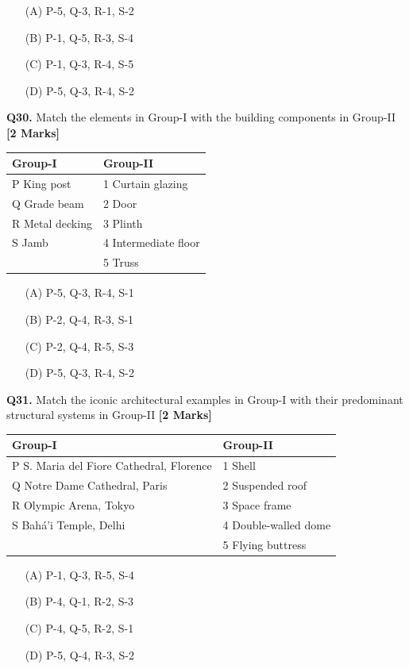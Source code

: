 \documentclass[11pt]{article}
\newcommand{\questionb}[2]{
    \noindent\textbf{Q#2.} #1 \hfill \textbf{[2 Marks]}
}
\begin{document}
\begin{enumerate}
    \item[(A)] P-5, Q-3, R-1, S-2
    \item[(B)] P-1, Q-5, R-3, S-4
    \item[(C)] P-1, Q-3, R-4, S-5
    \item[(D)] P-5, Q-3, R-4, S-2
\end{enumerate}
\vspace{0.5cm}

\questionb{Match the elements in Group-I with the building components in Group-II}{30}
\begin{tabularx}{\textwidth}{|l|X|}
\hline
\textbf{Group-I} & \textbf{Group-II} \\
\hline
P King post & 1 Curtain glazing \\
Q Grade beam & 2 Door \\
R Metal decking & 3 Plinth \\
S Jamb & 4 Intermediate floor \\
 & 5 Truss \\
\hline
\end{tabularx}
\begin{enumerate}
    \item[(A)] P-5, Q-3, R-4, S-1
    \item[(B)] P-2, Q-4, R-3, S-1
    \item[(C)] P-2, Q-4, R-5, S-3
    \item[(D)] P-5, Q-3, R-4, S-2
\end{enumerate}
\vspace{0.5cm}

\questionb{Match the iconic architectural examples in Group-I with their predominant structural systems in Group-II}{31}
\begin{tabularx}{\textwidth}{|l|X|}
\hline
\textbf{Group-I} & \textbf{Group-II} \\
\hline
P S. Maria del Fiore Cathedral, Florence & 1 Shell \\
Q Notre Dame Cathedral, Paris & 2 Suspended roof \\
R Olympic Arena, Tokyo & 3 Space frame \\
S Bahá'i Temple, Delhi & 4 Double-walled dome \\
 & 5 Flying buttress \\
\hline
\end{tabularx}
\begin{enumerate}
    \item[(A)] P-1, Q-3, R-5, S-4
    \item[(B)] P-4, Q-1, R-2, S-3
    \item[(C)] P-4, Q-5, R-2, S-1
    \item[(D)] P-5, Q-4, R-3, S-2
\end{enumerate}
\vspace{0.5cm}
\end{document}

